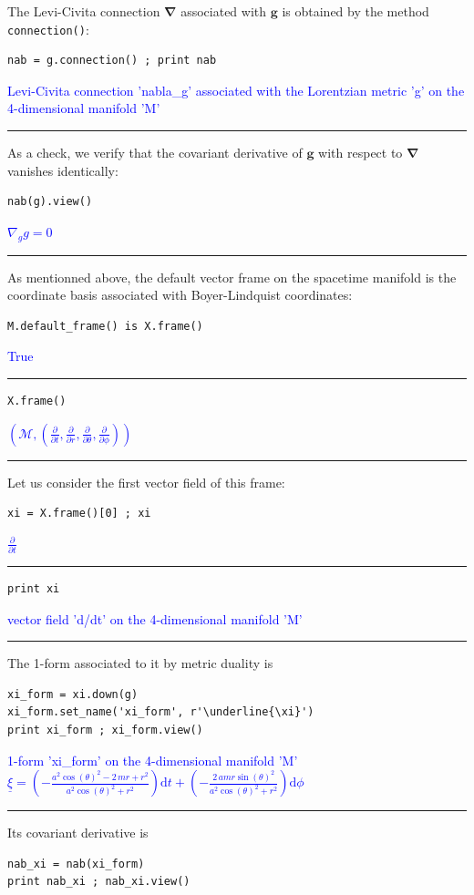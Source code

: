 \documentclass[a4paper]{jpconf}
\newcommand{\code}[1]{\texttt{#1}}
\newcommand{\w}[1]{\bm{#1}}
\newcommand{\soutput}[1]{\textcolor{blue}{#1}\\[-0.8ex]\rule{\textwidth}{0.4pt}}
\begin{document}
The Levi-Civita connection $\w{\nabla}$ associated with $\w{g}$ is obtained
by the method \code{connection()}:
\begin{verbatim}
nab = g.connection() ; print nab
\end{verbatim}
\soutput{Levi-Civita connection 'nabla\_g' associated with the Lorentzian metric
'g' on the 4-dimensional manifold 'M'}
As a check, we verify that the covariant derivative of $\w{g}$ with respect to
$\w{\nabla}$ vanishes identically:
\begin{verbatim}
nab(g).view()
\end{verbatim}
\soutput{$ \nabla_{g} g = 0$}
As mentionned above, 
the default vector frame on the spacetime manifold is the coordinate basis associated with Boyer-Lindquist coordinates:
\begin{verbatim}
M.default_frame() is X.frame()
\end{verbatim}
\soutput{True}
\begin{verbatim}
X.frame()
\end{verbatim}
\soutput{$\left(\mathcal{M} ,\left(\frac{\partial}{\partial t
},\frac{\partial}{\partial r },\frac{\partial}{\partial \theta
},\frac{\partial}{\partial \phi }\right)\right)$}
Let us consider the first vector field of this frame:
\begin{verbatim}
xi = X.frame()[0] ; xi
\end{verbatim}
\soutput{$\frac{\partial}{\partial t}$}
\begin{verbatim}
print xi 
\end{verbatim}
\soutput{vector field 'd/dt' on the 4-dimensional manifold 'M'}
The 1-form associated to it by metric duality is
\begin{verbatim}
xi_form = xi.down(g)
xi_form.set_name('xi_form', r'\underline{\xi}')
print xi_form ; xi_form.view()
\end{verbatim}
\soutput{1-form 'xi\_form' on the 4-dimensional manifold 'M'\\[1ex]
$\underline{\xi} = \left( -\frac{a^{2} \cos\left(\theta\right)^{2} - 2 \,
m r + r^{2}}{a^{2} \cos\left(\theta\right)^{2} + r^{2}} \right)
\mathrm{d} t + \left( -\frac{2 \, a m r
\sin\left(\theta\right)^{2}}{a^{2} \cos\left(\theta\right)^{2} + r^{2}}
\right) \mathrm{d} \phi$}
Its covariant derivative is
\begin{verbatim}
nab_xi = nab(xi_form)
print nab_xi ; nab_xi.view()
\end{verbatim}
\end{document}
